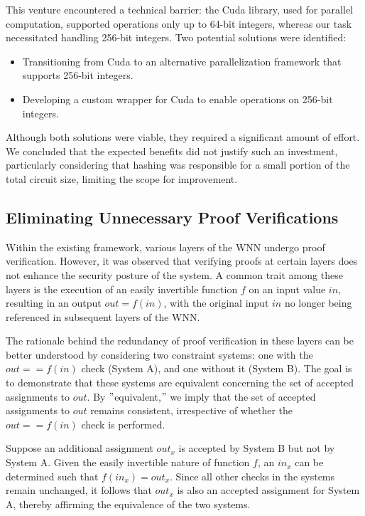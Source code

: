 \documentclass{article}[12pt]
\begin{document}
This venture encountered a technical barrier: the Cuda library, used for parallel computation, supported operations only up to 64-bit integers, whereas our task necessitated handling 256-bit integers.
Two potential solutions were identified:

\begin{itemize}
    \item Transitioning from Cuda to an alternative parallelization framework that supports 256-bit integers.
    \item Developing a custom wrapper for Cuda to enable operations on 256-bit integers.
\end{itemize}

Although both solutions were viable, they required a significant amount of effort.
We concluded that the expected benefits did not justify such an investment, particularly considering that hashing was responsible for a small portion of the total circuit size, limiting the scope for improvement.


\subsection{Eliminating Unnecessary Proof Verifications}\label{subsec:removing-redundant-proofs}

Within the existing framework, various layers of the WNN undergo proof verification.
However, it was observed that verifying proofs at certain layers does not enhance the security posture of the system.
A common trait among these layers is the execution of an easily invertible function \( f \) on an input value \( in \), resulting in an output \( out = f(in) \), with the original input \( in \) no longer being referenced in subsequent layers of the WNN.

The rationale behind the redundancy of proof verification in these layers can be better understood by considering two constraint systems: one with the \( out == f(in) \) check (System A), and one without it (System B). The goal is to demonstrate that these systems are equivalent concerning the set of accepted assignments to \( out \).
By \("\)equivalent,\("\) we imply that the set of accepted assignments to \( out \) remains consistent, irrespective of whether the \( out == f(in) \) check is performed.

Suppose an additional assignment \( out_x \) is accepted by System B but not by System A. Given the easily invertible nature of function \( f \), an \( in_x \) can be determined such that \( f(in_x) = out_x \).
Since all other checks in the systems remain unchanged, it follows that \( out_x \) is also an accepted assignment for System A, thereby affirming the equivalence of the two systems.
\end{document}
